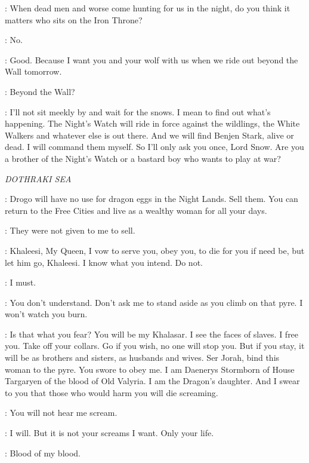 \JEOR: When dead men and worse come hunting for us in the night, do you think it matters who sits on the Iron Throne? 

\JON: No. 

\JEOR: Good. Because I want you and your wolf with us when we ride out beyond the Wall tomorrow. 

\JON: Beyond the Wall? 

\JEOR: I'll not sit meekly by and wait for the snows. I mean to find out what's happening. The Night's Watch will ride in force against the wildlings, the White Walkers and whatever else is out there. And we will find Benjen Stark, alive or dead. I will command them myself. So I'll only ask you once, Lord Snow. Are you a brother of the Night's Watch or a bastard boy who wants to play at war? 


\scene

\textit{DOTHRAKI SEA}


\JORAH: Drogo will have no use for dragon eggs in the Night Lands. Sell them. You can return to the Free Cities and live as a wealthy woman for all your days. 

\DAENERYS: They were not given to me to sell. 

\JORAH: Khaleesi, My Queen, I vow to serve you, obey you, to die for you if need be, but let him go, Khaleesi. I know what you intend. Do not. 

\DAENERYS: I must. 

\JORAH: You don't understand. Don't ask me to stand aside as you climb on that pyre. I won't watch you burn. 

\DAENERYS: Is that what you fear?   You will be my Khalasar. I see the faces of slaves. I free you. Take off your collars. Go if you wish, no one will stop you. But if you stay, it will be as brothers and sisters, as husbands and wives. Ser Jorah, bind this woman to the pyre. You swore to obey me. I am Daenerys Stormborn of House Targaryen of the blood of Old Valyria. I am the Dragon's daughter. And I swear to you that those who would harm you will die screaming. 

\MIRRI: You will not hear me scream. 

\DAENERYS: I will. But it is not your screams I want. Only your life. 


\JORAH:  Blood of my blood. 


